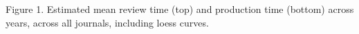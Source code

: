 Figure 1. Estimated mean review time (top) and production time (bottom) across years, across all journals, including loess curves. 